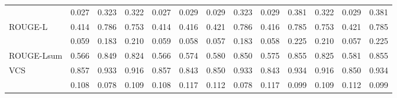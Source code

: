 \begin{table}[htbp]
\begin{adjustbox}{max width=\textwidth}
\begin{tabular}{@{}l*{12}{c}@{}}
                    & 0.027 & 0.323 & 0.322 & 0.027 & 0.029 & 0.029 & 0.323 & 0.029 & 0.381 & 0.322 & 0.029 & 0.381 \\
      \cmidrule(lr){2-13}
      ROUGE-L \cite{lin2004rouge}       & 0.414 & 0.786 & 0.753 & 0.414 & 0.416 & 0.421 & 0.786 & 0.416 & 0.785 & 0.753 & 0.421 & 0.785 \\
                    & 0.059 & 0.183 & 0.210 & 0.059 & 0.058 & 0.057 & 0.183 & 0.058 & 0.225 & 0.210 & 0.057 & 0.225 \\
      \cmidrule(lr){2-13}
      ROUGE-Lsum \cite{lin2004rouge}    & 0.566 & 0.849 & 0.824 & 0.566 & 0.574 & 0.580 & 0.850 & 0.575 & 0.855 & 0.825 & 0.581 & 0.855 \\

      \cmidrule(lr){2-13}
      VCS   & 0.857 & 0.933 & 0.916 & 0.857 & 0.843 & 0.850 & 0.933 & 0.843 & 0.934 & 0.916 & 0.850 & 0.934 \\
                    & 0.108 & 0.078 & 0.109 & 0.108 & 0.117 & 0.112 & 0.078 & 0.117 & 0.099 & 0.109 & 0.112 & 0.099 \\
      \bottomrule
    \end{tabular}
  \end{adjustbox}
\end{table}